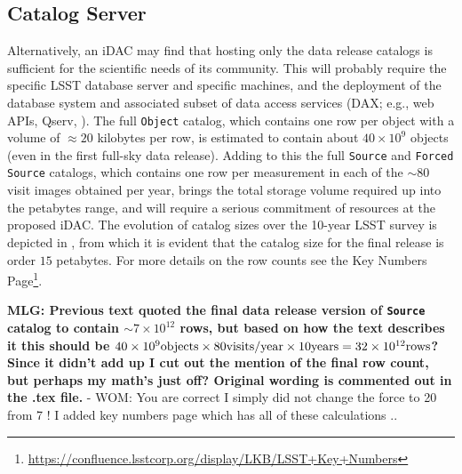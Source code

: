 \subsection{Catalog Server}

Alternatively, an iDAC may find that hosting only the data release catalogs is sufficient for the scientific needs of its community. This will probably require the specific LSST database server  and specific machines, and the deployment of the database system and associated subset of data access services (DAX; e.g., web APIs, Qserv, ). The full {\tt Object} catalog, which contains one row per object with a volume of $\approx 20$ kilobytes per row, is estimated to contain about $40 \times 10^9$ objects (even in the first full-sky data release). Adding to this the full {\tt Source} and {\tt Forced Source} catalogs, which contains one row per measurement in each of the $\sim80$ visit images obtained per year, brings the total storage volume required up into the petabytes range, and will require a serious commitment of resources at the proposed iDAC. The evolution of catalog sizes over the 10-year LSST survey is depicted in , from which it is evident that the catalog size for the final release is order $15$ petabytes. For more details on the row counts see the Key Numbers Page\footnote{\url{https://confluence.lsstcorp.org/display/LKB/LSST+Key+Numbers}}.

{\bf MLG: Previous text quoted the final data release version of {\tt Source} catalog to contain $\sim7 \times 10^{12}$ rows, but based on how the text describes it this should be $40 \times 10^9 {\rm objects} \times 80 {\rm visits / year} \times 10 {\rm years} = 32 \times 10^{12} {\rm rows}$? Since it didn't add up I cut out the mention of the final row count, but perhaps my math's just off? Original wording is commented out in the .tex file.} - WOM: You are correct I simply did not change the force to 20 from 7 !  I added key numbers page which has all of these calculations ..


